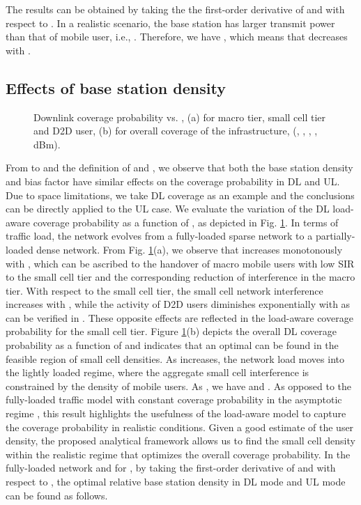 \documentclass[twocolumn,english]{IEEEtran}
\theoremstyle{plain}
\theoremstyle{definition}
\begin{document}
The results can be obtained by taking the the first-order derivative
of  and 
with respect to . In a realistic scenario, the
base station has larger transmit power than that of mobile user, i.e.,
. Therefore, we have ,
which means that  decreases with .


\subsection{Effects of base station density}

\begin{figure}[t]


\protect\caption{\label{fig:Ave_Cove_dense}Downlink coverage probability vs. ,
(a) for macro tier, small cell tier and D2D user, (b) for overall
coverage of the infrastructure, (,
, ,
,
 dBm). }
\end{figure}


From  to  and the definition
of  and ,
we observe that both the base station density and bias factor have
similar effects on the coverage probability in DL and UL. Due to space
limitations, we take DL coverage as an example and the conclusions
can be directly applied to the UL case. We evaluate the variation
of the DL load-aware coverage probability as a function of ,
as depicted in Fig. \ref{fig:Ave_Cove_dense}. In terms of traffic
load, the network evolves from a fully-loaded sparse network to a
partially-loaded dense network. From Fig. \ref{fig:Ave_Cove_dense}(a),
we observe that  increases
monotonously with , which can be ascribed to
the handover of macro mobile users with low SIR to the small cell
tier and the corresponding reduction of interference in the macro
tier. With respect to the small cell tier, the small cell network
interference increases with , while the activity
of D2D users diminishes exponentially with 
as can be verified in . These opposite
effects are reflected in the load-aware coverage probability for the
small cell tier. Figure \ref{fig:Ave_Cove_dense}(b) depicts the overall
DL coverage probability  as a function
of  and indicates that an optimal 
can be found in the feasible region of small cell densities. As 
increases, the network load moves into the lightly loaded regime,
where the aggregate small cell interference is constrained by the
density of mobile users. As ,
we have  and .
As opposed to the fully-loaded traffic model with constant coverage
probability in the asymptotic regime \cite{ATAT,MAKT}, this result
highlights the usefulness of the load-aware model to capture the coverage
probability in realistic conditions. Given a good estimate of the
user density, the proposed analytical framework allows us to find
the small cell density within the realistic regime that optimizes
the overall coverage probability. In the fully-loaded network and
for , by taking the first-order derivative
of  and 
with respect to , the
optimal relative base station density in DL mode 
and UL mode 
can be found as follows.
\end{document}
